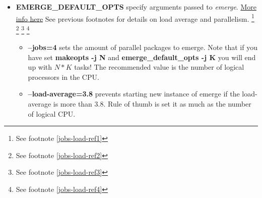 \documentclass[10pt,a4paper]{article}
\begin{document}
\begin{itemize}
                    \begin{itemize}[label={o}]
                        
                        \item \textbf{--jobs=4} defines how many parallel sessions to trigger, if they are possible. The recommended value is the number of logical processors in the CPU. You can obtain that number with the following command
                        
    \begin{lstlisting}[style=BashInputUser]
    user$ nproc --all
    \end{lstlisting}
                        
                        \item \textbf{--load-average=3.8} option: This option prevents starting new installations if the load-average is more than $ 3.8 $. It is recommend your load-average to be as much as the number of logical CPU.
                        
                    \end{itemize}     
                    
                    \item \textbf{EMERGE\_DEFAULT\_OPTS} specify arguments passed to \textit{emerge}. \href{https://wiki.gentoo.org/wiki/EMERGE_DEFAULT_OPTS}{More info here} See previous footnotes for details on load average and parallelism. 
                    \footnote{ See footnote \ref{jobs-load-ref1}}
                    \footnote{ See footnote \ref{jobs-load-ref2}}
                    \footnote{ See footnote \ref{jobs-load-ref3}}
                    \footnote{ See footnote \ref{jobs-load-ref4}} 
    

                
                    \begin{itemize}[label={o}]
                        \item \textbf{--jobs=4} sets the amount of parallel packages to emerge. Note that if you have set \textbf{makeopts -j N} and \textbf{emerge\_default\_opts -j K} you will end up with $ N*K $ tasks! The recommended value is the number of logical processors in the CPU.
                        
                        \item \textbf{--load-average=3.8} prevents starting new instance of emerge if the load-average is more than $ 3.8 $. Rule of thumb is set it as much as the number of logical CPU.
                        

\end{itemize}
\end{itemize}
\end{document}
